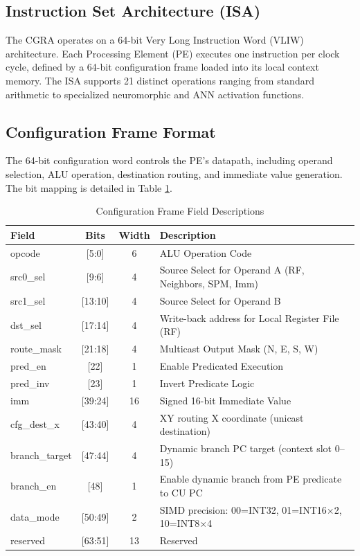 \subsection{Instruction Set Architecture (ISA)}

The CGRA operates on a 64-bit Very Long Instruction Word (VLIW) architecture. Each Processing Element (PE) executes one instruction per clock cycle, defined by a 64-bit configuration frame loaded into its local context memory. The ISA supports 21 distinct operations ranging from standard arithmetic to specialized neuromorphic and ANN activation functions.

\subsection{Configuration Frame Format}
The 64-bit configuration word controls the PE's datapath, including operand selection, ALU operation, destination routing, and immediate value generation. The bit mapping is detailed in Table \ref{tab:config_frame}.

\begin{table}[ht!]
\centering
\singlespacing
\caption{Configuration Frame Field Descriptions}
\label{tab:config_frame}
\begin{tabularx}{\textwidth}{|l|c|c|X|}
\hline
\textbf{Field} & \textbf{Bits} & \textbf{Width} & \textbf{Description} \\ \hline
opcode & [5:0] & 6 & ALU Operation Code \\
src0\_sel & [9:6] & 4 & Source Select for Operand A (RF, Neighbors, SPM, Imm) \\
src1\_sel & [13:10] & 4 & Source Select for Operand B \\
dst\_sel & [17:14] & 4 & Write-back address for Local Register File (RF) \\
route\_mask & [21:18] & 4 & Multicast Output Mask (N, E, S, W) \\
pred\_en & [22] & 1 & Enable Predicated Execution \\
pred\_inv & [23] & 1 & Invert Predicate Logic \\
imm & [39:24] & 16 & Signed 16-bit Immediate Value \\
cfg\_dest\_x & [43:40] & 4 & XY routing X coordinate (unicast destination) \\
branch\_target & [47:44] & 4 & Dynamic branch PC target (context slot 0--15) \\
branch\_en & [48] & 1 & Enable dynamic branch from PE predicate to CU PC \\
data\_mode & [50:49] & 2 & SIMD precision: 00=INT32, 01=INT16$\times$2, 10=INT8$\times$4 \\
reserved & [63:51] & 13 & Reserved \\ \hline
\end{tabularx}
\end{table}

